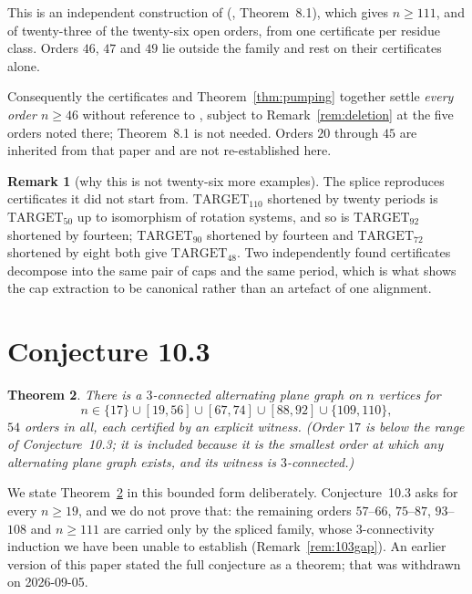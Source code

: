 \documentclass[11pt,a4paper]{amsart}
\theoremstyle{plain}
\newtheorem{theorem}{Theorem}[section]
\theoremstyle{definition}
\newtheorem{remark}[theorem]{Remark}
\begin{document}
This is an independent construction of (\cite{AHSSV2015}, Theorem~8.1), which
gives $n \ge 111$, and of twenty-three of the twenty-six open orders, from one
certificate per residue class. Orders $46$, $47$ and $49$ lie outside the family
and rest on their certificates alone.

Consequently the certificates and Theorem~\ref{thm:pumping} together settle
\emph{every order $n \ge 46$} without reference to \cite{AHSSV2015}, subject to
Remark~\ref{rem:deletion} at the five orders noted there; Theorem~8.1 is not
needed. Orders $20$ through $45$ are inherited from that paper and are not
re-established here.

\begin{remark}[why this is not twenty-six more examples]
The splice reproduces certificates it did not start from.
$\mathrm{TARGET}_{110}$ shortened by twenty periods is $\mathrm{TARGET}_{50}$ up
to isomorphism of rotation systems, and so is $\mathrm{TARGET}_{92}$ shortened
by fourteen; $\mathrm{TARGET}_{90}$ shortened by fourteen and
$\mathrm{TARGET}_{72}$ shortened by eight both give $\mathrm{TARGET}_{48}$. Two
independently found certificates decompose into the same pair of caps and the
same period, which is what shows the cap extraction to be canonical rather than
an artefact of one alignment.
\end{remark}

\section{Conjecture 10.3}\label{sec:103}

\begin{theorem}\label{thm:103}
There is a $3$-connected alternating plane graph on $n$ vertices for
$$n \in \{17\} \cup [19,56] \cup [67,74] \cup [88,92] \cup \{109,110\},$$
$54$ orders in all, each certified by an explicit witness. (Order $17$ is
below the range of Conjecture~10.3; it is included because it is the smallest
order at which any alternating plane graph exists, and its witness is
$3$-connected.)
\end{theorem}

We state Theorem~\ref{thm:103} in this bounded form deliberately.
Conjecture~10.3 asks for every $n \ge 19$, and we do not prove that: the
remaining orders $57$--$66$, $75$--$87$, $93$--$108$ and $n \ge 111$ are carried
only by the spliced family, whose $3$-connectivity induction we have been unable
to establish (Remark~\ref{rem:103gap}). An earlier version of this paper stated
the full conjecture as a theorem; that was withdrawn on 2026-09-05.
\end{document}
